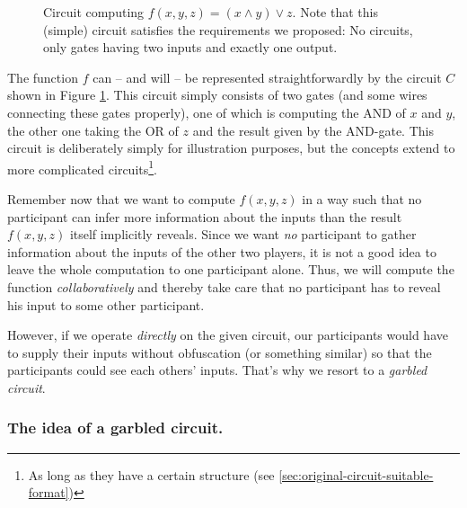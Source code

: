 \begin{figure}[t]
  \centering
  \caption{Circuit computing $f(x,y,z)=(x\wedge y)\vee z$. Note that this (simple) circuit satisfies the requirements we proposed: No circuits, only gates having two inputs and exactly one output.}
  \label{fig:simple-circuit}
\end{figure}

The function $f$ can -- and will -- be represented straightforwardly by the circuit $C$ shown in Figure \ref{fig:simple-circuit}. This circuit simply consists of two gates (and some wires connecting these gates properly), one of which is computing the AND of $x$ and $y$, the other one taking the OR of $z$ and the result given by the AND-gate. This circuit is deliberately simply for illustration purposes, but the concepts extend to more complicated circuits\footnote{As long as they have a certain structure (see \ref{sec:original-circuit-suitable-format})}.

Remember now that we want to compute $f(x,y,z)$ in a way such that no participant can infer more information about the inputs than the result $f(x,y,z)$ itself implicitly reveals. Since we want \emph{no} participant to gather information about the inputs of the other two players, it is not a good idea to leave the whole computation to one participant alone. Thus, we will compute the function \emph{collaboratively} and thereby take care that no participant has to reveal his input to some other participant.

However, if we operate \emph{directly} on the given circuit, our participants would have to supply their inputs without obfuscation (or something similar) so that the participants could see each others' inputs. That's why we resort to a \emph{garbled circuit}.

\subsubsection{The idea of a  garbled circuit.}


